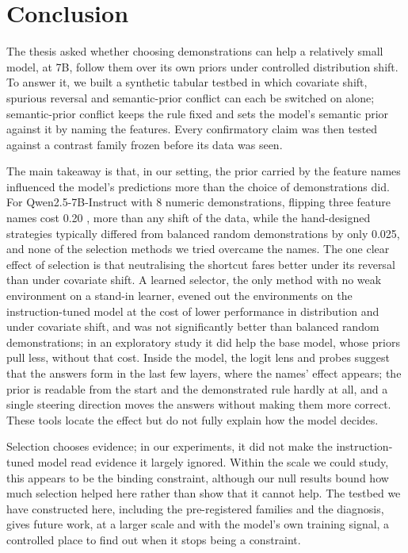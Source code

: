 \chapter{Conclusion}
\label{ch:conclusion}

The thesis asked whether choosing demonstrations can help a relatively small model, at 7B, follow them over its own priors under controlled distribution shift. To answer it, we built a synthetic tabular testbed in which covariate shift, spurious reversal and semantic-prior conflict can each be switched on alone; semantic-prior conflict keeps the rule fixed and sets the model's semantic prior against it by naming the features. Every confirmatory claim was then tested against a contrast family frozen before its data was seen.

The main takeaway is that, in our setting, the prior carried by the feature names influenced the model's predictions more than the choice of demonstrations did. For Qwen2.5-7B-Instruct with 8 numeric demonstrations, flipping three feature names cost 0.20 \AUROC, more than any shift of the data, while the hand-designed strategies typically differed from balanced random demonstrations by only 0.025, and none of the selection methods we tried overcame the names. The one clear effect of selection is that neutralising the shortcut fares better under its reversal than under covariate shift. A learned selector, the only method with no weak environment on a stand-in learner, evened out the environments on the instruction-tuned model at the cost of lower performance in distribution and under covariate shift, and was not significantly better than balanced random demonstrations; in an exploratory study it did help the base model, whose priors pull less, without that cost. Inside the model, the logit lens and probes suggest that the answers form in the last few layers, where the names' effect appears; the prior is readable from the start and the demonstrated rule hardly at all, and a single steering direction moves the answers without making them more correct. These tools locate the effect but do not fully explain how the model decides.

Selection chooses evidence; in our experiments, it did not make the instruction-tuned model read evidence it largely ignored. Within the scale we could study, this appears to be the binding constraint, although our null results bound how much selection helped here rather than show that it cannot help. The testbed we have constructed here, including the pre-registered families and the diagnosis, gives future work, at a larger scale and with the model's own training signal, a controlled place to find out when it stops being a constraint.
